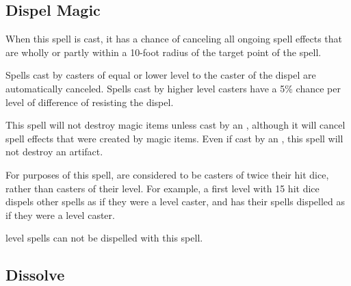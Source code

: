 \begin{multicols*}{2}
\subsection{Dispel Magic}\label{spell:Dispel Magic}

When this spell is cast, it has a chance of canceling all ongoing spell effects that are wholly or partly within a 10-foot radius of the target point of the spell.

Spells cast by casters of equal or lower level to the caster of the dispel are automatically canceled. Spells cast by higher level casters have a 5\% chance per level of difference of resisting the dispel.


This spell will not destroy magic items unless cast by an , although it will cancel spell effects that were created by magic items. Even if cast by an , this spell will not destroy an artifact.

For purposes of this spell,  are considered to be casters of twice their hit dice, rather than casters of their level. For example, a first level  with 15 hit dice dispels other spells as if they were a  level caster, and has their spells dispelled as if they were a  level caster.

 level spells can not be dispelled with this spell.

\subsection{Dissolve}\label{spell:Dissolve}
\end{multicols*}
